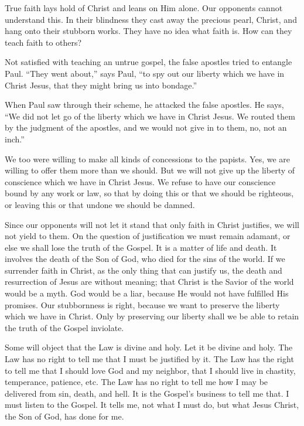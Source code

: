 True faith lays hold of Christ and leans on Him alone. Our opponents cannot understand this. In their blindness they cast away the precious pearl, Christ, and hang onto their stubborn works. They have no idea what faith is. How can they teach faith to others?

Not satisfied with teaching an untrue gospel, the false apostles tried to entangle Paul. “They went about,” says Paul, “to spy out our liberty which we have in Christ Jesus, that they might bring us into bondage.”

When Paul saw through their scheme, he attacked the false apostles. He says, “We did not let go of the liberty which we have in Christ Jesus. We routed them by the judgment of the apostles, and we would not give in to them, no, not an inch.”

We too were willing to make all kinds of concessions to the papists. Yes, we are willing to offer them more than we should. But we will not give up the liberty of conscience which we have in Christ Jesus. We refuse to have our conscience bound by any work or law, so that by doing this or that we should be righteous, or leaving this or that undone we should be damned.

Since our opponents will not let it stand that only faith in Christ justifies, we will not yield to them. On the question of justification we must remain adamant, or else we shall lose the truth of the Gospel. It is a matter of life and death. It involves the death of the Son of God, who died for the sins of the world. If we surrender faith in Christ, as the only thing that can justify us, the death and resurrection of Jesus are without meaning; that Christ is the Savior of the world would be a myth. God would be a liar, because He would not have fulfilled His promises. Our stubbornness is right, because we want to preserve the liberty which we have in Christ. Only by preserving our liberty shall we be able to retain the truth of the Gospel inviolate.

Some will object that the Law is divine and holy. Let it be divine and holy. The Law has no right to tell me that I must be justified by it. The Law has the right to tell me that I should love God and my neighbor, that I should live in chastity, temperance, patience, etc. The Law has no right to tell me how I may be delivered from sin, death, and hell. It is the Gospel’s business to tell me that. I must listen to the Gospel. It tells me, not what I must do, but what Jesus Christ, the Son of God, has done for me.

